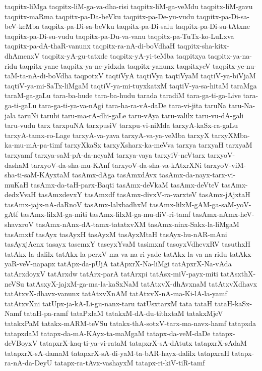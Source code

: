 {taqpitx-liMga
taqpitx-liM-ga-va-dha-risi
taqpitx-liM-ga-veMdu
taqpitx-liM-gavu
taqpitx-maRma
taqpitx-pa-Da-beVku
taqpitx-pa-De-yu-vudu
taqpitx-pa-Di-sa-beV-keMba
taqpitx-pa-Di-sa-beVku
taqpitx-pa-Di-salu
taqpitx-pa-Di-su-tAtxne
taqpitx-pa-Di-su-vudu
taqpitx-pa-Du-va-vanu
taqpitx-pa-TuTx-ko-LuLxva
taqpitx-pa-dA-thaR-vanunx
taqpitx-ra-nA-di-boVdhaH
taqpitx-sha-kitx-dhAmenxV
taqpitx-yA-gu-tatxde
taqpitx-yA-yi-teMba
taqpitxya
taqpitx-ya-na-ridu
taqpitx-yane
taqpitx-ya-ne-yidxda
taqpitx-yanunx
taqpitxyeV
taqpitx-ye-nu-taM-ta-nA-di-boVdha
taqpotxV
taqtiVyA
taqtiVya
taqtiVyaM
taqtiV-ya-biVjaM
taqtiV-ya-mi-SaTx-liMgaM
taqtiV-ya-mi-tuyxkatxM
taqtiV-ya-sa-hitaM
taraMga
taraM-ga-gaLu
tara-ba-hude
tara-ba-hudu
tarada
taradiM
tara-ga-ti-ga-Live
tara-ga-ti-gaLu
tara-ga-ti-ya-va-nAgi
tara-ha-ra-vA-daDe
tara-vi-jita
taruNa
taru-Na-jala
taruNi
tarubi
taru-ma-rA-dhi-gaLe
taru-vAya
taru-valilx
taru-vu-dA-gali
taru-vudu
tarx
tarxpuNA
tarxpusiV
tarxpu-vi-niMda
tarxyA-kaSx-ra-gaLu
tarxyA-tamx-ro-Lage
tarxyA-va-yava
tarxyA-va-ya-veMba
tarxyX
tarxyXMba-ka-mu-mA-pa-timf
tarxyXkaSx
tarxyXsharx-ka-meVva
tarxya
tarxyaH
tarxyaM
tarxyamf
tarxya-saM-pA-da-neyaM
tarxya-vaya
tarxyiV-neVtarx
tarxyoV-dashaM
tarxyoV-da-sha-mu-KAnf
tarxyoV-da-sha-va-kAtxrXNi
tarxyoV-viM-sha-ti-saM-KAyxtaM
tasAmx-dAga
tasAmxdAvx
tasAmx-da-nayx-tarx-vi-muKaH
tasAmx-da-taH-parx-Baqti
tasAmx-deVkaM
tasAmx-deVteV
tasAmx-dedxVvaH
tasAmxdevxY
tasAmxdf
tasAmx-divxV-ra-varxteV
tasAmx-jAjxtaH
tasAmx-jajx-nA-daRnoV
tasAmx-lalxbadhxM
tasAmx-lilxM-gAM-ga-saM-yoV-gAtf
tasAmx-lilxM-ga-miti
tasAmx-lilxM-ga-mu-diV-ri-tamf
tasAmx-nAmx-heV-shavxroV
tasAmx-nAnx-dA-tamx-tatatxvXM
tasAmx-ninx-Sakx-la-liMgaM
tasAmxtf
tasAyx
tasAyxH
tasAyxM
tasAyxMtaH
tasAyx-hu-nAR-mAni
tasAyxjAcnx
tasayx
tasemxY
taseyxYvaM
tasimxnf
tasoyxVdhevxRV
tasuthxH
tatAkx-la-dalilx
tatAkx-la-perxV-ma-va-na-ri-yade
tatAkx-la-va-na-ridu
tatAkx-yaR-veV-napapx
tatApx-da-pUjA
tatApxrX-Na-liMgi
tatApxrX-Na-vAda
tatArxdoyxV
tatArxdw
tatArx-parA
tatArxpi
tatAsx-miV-payx-miti
tatAsxthX-neVSu
tatAsxyX-jajxM-ga-ma-la-kaSxNaM
tatAtxvX-dhAvxnaM
tatAtxvXdhavx
tatAtxvX-dhavx-vanunx
tatAtxvXnAM
tatAtxvX-nA-ma-Ki-lA-la-yamf
tatAtxvXni
tatUpx-ja-kA-Li-gu-nanx-taru
tatUsxtarxM
tata
tataH
tataH-kaSx-Namf
tataH-pa-ramf
tataPxlaM
tatakxM-dA-du-tithxtaM
tatakxMjeV
tatakxPaM
tatakx-mARM-teVSu
tatakx-thA-sotxV-tarx-ma-navx-hamf
tatapxda
tatapxdaM
tatapx-da-mA-KAyx-ta-maMgaM
tatapx-da-veM-daDe
tatapx-deVBoyxV
tatapxrX-kaq-ti-ya-vi-rataM
tatapxrX-sA-dAtutx
tatapxrX-sAdaM
tatapxrX-sA-damaM
tatapxrX-sA-di-yaM-ta-bAR-hayx-dalilx
tatapxraH
tatapx-ra-nA-da-DeyU
tatapx-ra-tAvx-vashayxM
tatapx-ri-kiV-tiR-tamf
}
